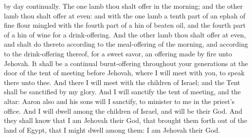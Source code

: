by day continually. The one lamb thou shalt offer in the morning; and the other lamb thou shalt offer at even: and with the one lamb a tenth part of an ephah of fine flour mingled with the fourth part of a hin of beaten oil, and the fourth part of a hin of wine for a drink-offering. And the other lamb thou shalt offer at even, and shalt do thereto according to the meal-offering of the morning, and according to the drink-offering thereof, for a sweet savor, an offering made by fire unto Jehovah. It shall be a continual burnt-offering throughout your generations at the door of the tent of meeting before Jehovah, where I will meet with you, to speak there unto thee. And there I will meet with the children of Israel; and the Tent shall be sanctified by my glory. And I will sanctify the tent of meeting, and the altar: Aaron also and his sons will I sanctify, to minister to me in the priest’s office. And I will dwell among the children of Israel, and will be their God. And they shall know that I am Jehovah their God, that brought them forth out of the land of Egypt, that I might dwell among them: I am Jehovah their God. 


